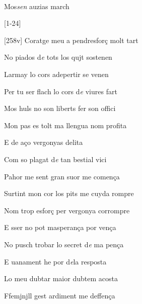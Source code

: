 \documentclass[12pt]{article}
\renewcommand{\espaiAbansEtiquetaPoema}{\vspace{0ex}}
\begin{document}
\begin{estrofa}

\espaiAbansEtiquetaPoema

\\

\begin{rubrica}

Mos\textit{sen} auzias march

\end{rubrica}

\begin{Versos}

[1-24]

\end{Versos}

\end{estrofa}


\begin{estrofa}

 [258v] Coratge meu a pendresfor\c{c} molt tart

 No piados d\textit{e} tots los qujt sostenen

 Larmay lo cors adepertir se venen

 Per tu ser flach lo cors d\textit{e} viures fart

 Mos huls no son liberts fer son offici

 Mon pas es tolt ma llengua nom profita

 E de a\c{c}o vergonyas delita

 Com so plagat d\textit{e} tan bestial vici

\end{estrofa}



\begin{estrofa}

 Pahor me sent gran suor me comen\c{c}a

 Surtint mon cor los pits me cuyda rompre

 Nom trop esfor\c{c} per vergonya corrompre

 E sser no pot masperan\c{c}a por ven\c{c}a

 No pusch trobar lo secret d\textit{e} ma pen\c{c}a

 E uanament he por d\textit{e}la resposta

 Lo meu dubtar maior dubtem acosta

 Ffemjnjll gest ardiment me deffen\c{c}a

\end{estrofa}
\end{document}
